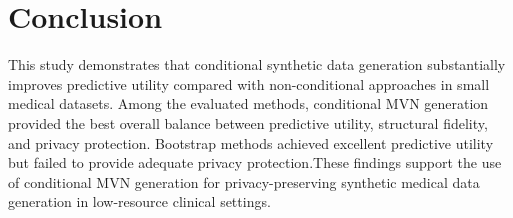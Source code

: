 \documentclass[twoside]{article}
\begin{document}
\section{Conclusion}

\noindent This study demonstrates that conditional synthetic data generation substantially improves predictive utility compared with non-conditional approaches in small medical datasets. Among the evaluated methods, conditional MVN generation provided the best overall balance between predictive utility, structural fidelity, and privacy protection. Bootstrap methods achieved excellent predictive utility but failed to provide adequate privacy protection.These findings support the use of conditional MVN generation for privacy-preserving synthetic medical data generation in low-resource clinical settings.
\end{document}
